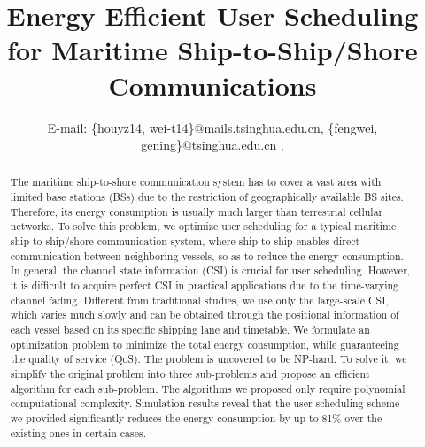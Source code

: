 \documentclass[conference]{IEEEtran}
\begin{document}
\title{Energy Efficient User Scheduling for Maritime Ship-to-Ship/Shore Communications}

\author{
 E-mail: \{houyz14, wei-t14\}@mails.tsinghua.edu.cn, \{fengwei, gening\}@tsinghua.edu.cn , %
}





\maketitle

\begin{abstract}

The maritime ship-to-shore communication system has to cover a vast area with limited base stations (BSs) due to the restriction of geographically available BS sites. Therefore, its energy consumption is usually much larger than terrestrial cellular networks. To solve this problem, we optimize user scheduling for a typical maritime ship-to-ship/shore communication system, where ship-to-ship enables direct communication between neighboring vessels, so as to reduce the energy consumption. 
In general, the channel state information (CSI) is crucial for user scheduling. However, it is difficult to acquire perfect CSI in practical applications due to the time-varying channel fading. Different from traditional studies, we use only the large-scale CSI, which varies much slowly and can be obtained through the positional information of each vessel based on its specific shipping lane and timetable. 
We formulate an optimization problem to minimize the total energy consumption, while guaranteeing the quality of service (QoS). The problem is uncovered to be NP-hard. To solve it, we simplify the original problem into three sub-problems and propose an efficient algorithm for each sub-problem. The algorithms we proposed only require polynomial computational complexity. Simulation results reveal that the user scheduling scheme we provided significantly reduces the energy consumption by up to 81\% over the existing ones in certain cases.
\end{abstract}
\end{document}
